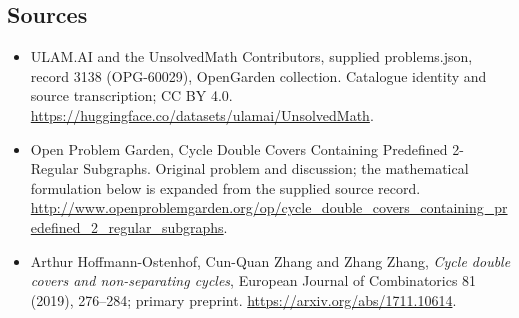 \documentclass[11pt,a4paper]{article}
\begin{document}
\subsection{Sources}
\begin{itemize}
\item[S1] ULAM.AI and the UnsolvedMath Contributors, supplied problems.json, record 3138 (OPG-60029), OpenGarden collection. Catalogue identity and source transcription; CC BY 4.0.
\url{https://huggingface.co/datasets/ulamai/UnsolvedMath}.
\item[S2] Open Problem Garden, Cycle Double Covers Containing Predefined 2-Regular Subgraphs. Original problem and discussion; the mathematical formulation below is expanded from the supplied source record.
\url{http://www.openproblemgarden.org/op/cycle_double_covers_containing_predefined_2_regular_subgraphs}.

\item[R1] Arthur Hoffmann-Ostenhof, Cun-Quan Zhang and Zhang Zhang,
\emph{Cycle double covers and non-separating cycles}, European
Journal of Combinatorics 81 (2019), 276--284; primary preprint.
\url{https://arxiv.org/abs/1711.10614}.

\end{itemize}
\end{document}
